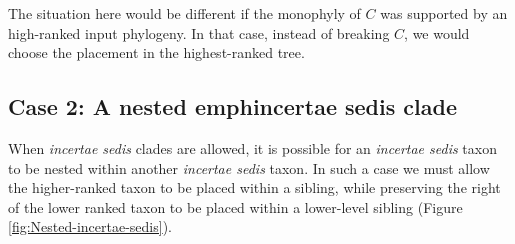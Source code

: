 \documentclass[english]{article}
\begin{document}
The situation here would be different if the monophyly of $C$ was
supported by an high-ranked input phylogeny. In that case, instead of
breaking $C$, we would choose the placement in the highest-ranked
tree.

\subsection{Case 2: A nested emph{incertae sedis} clade}

When \emph{incertae sedis} clades are allowed, it is possible for an
\emph{incertae sedis} taxon to be nested within another \emph{incertae
sedis} taxon. In such a case we must allow the higher-ranked taxon to
be placed within a sibling, while preserving the right of the lower
ranked taxon to be placed within a lower-level sibling (Figure
\ref{fig:Nested-incertae-sedis}).
\end{document}
